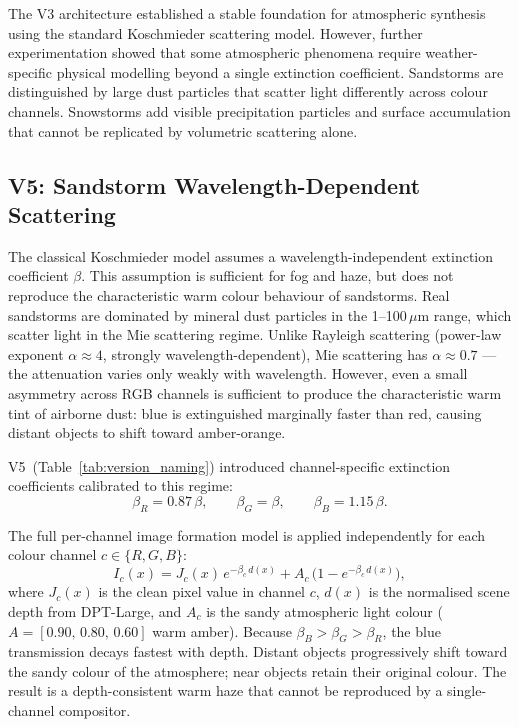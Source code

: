 \noindent The V3 architecture established a stable foundation for atmospheric synthesis using the standard Koschmieder scattering model. However, further experimentation showed that some atmospheric phenomena require weather-specific physical modelling beyond a single extinction coefficient. Sandstorms are distinguished by large dust particles that scatter light differently across colour channels. Snowstorms add visible precipitation particles and surface accumulation that cannot be replicated by volumetric scattering alone.

\FloatBarrier
\subsection{V5: Sandstorm Wavelength-Dependent Scattering}
\label{sec:v5_sandstorm}

\noindent The classical Koschmieder model assumes a wavelength-independent extinction coefficient $\beta$. This assumption is sufficient for fog and haze, but does not reproduce the characteristic warm colour behaviour of sandstorms. Real sandstorms are dominated by mineral dust particles in the 1--100\,$\mu$m range, which scatter light in the Mie scattering regime. Unlike Rayleigh scattering (power-law exponent $\alpha \approx 4$, strongly wavelength-dependent), Mie scattering has $\alpha \approx 0.7$ — the attenuation varies only weakly with wavelength. However, even a small asymmetry across RGB channels is sufficient to produce the characteristic warm tint of airborne dust: blue is extinguished marginally faster than red, causing distant objects to shift toward amber-orange.

\noindent V5~(Table~\ref{tab:version_naming}) introduced channel-specific extinction coefficients calibrated to this regime:
\begin{equation}
    \beta_R = 0.87\,\beta, \qquad \beta_G = \beta, \qquad \beta_B = 1.15\,\beta.
\end{equation}

The full per-channel image formation model is applied independently for each colour channel $c \in \{R,G,B\}$:
\begin{equation}
    I_c(x) = J_c(x)\,e^{-\beta_c\,d(x)} + A_c\,\bigl(1 - e^{-\beta_c\,d(x)}\bigr),
\end{equation}
where $J_c(x)$ is the clean pixel value in channel $c$, $d(x)$ is the normalised scene depth from DPT-Large, and $A_c$ is the sandy atmospheric light colour ($A = [0.90,\,0.80,\,0.60]$ warm amber). Because $\beta_B > \beta_G > \beta_R$, the blue transmission decays fastest with depth. Distant objects progressively shift toward the sandy colour of the atmosphere; near objects retain their original colour. The result is a depth-consistent warm haze that cannot be reproduced by a single-channel compositor.

